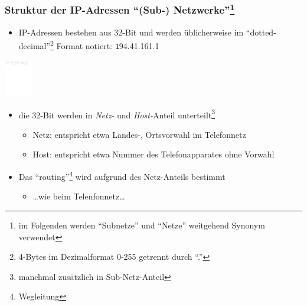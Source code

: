\documentclass{beamer}
\begin{document}
\begin{frame}
\frametitle{Struktur der IP-Adressen ``(Sub-) Netzwerke''\footnote{im Folgenden werden ``Subnetze'' und ``Netze'' weitgehend Synonym verwendet}}
\begin{itemize}
	\item{IP-Adressen bestehen aus 32-Bit und werden \"ublicherweise im ``dotted-decimal''\footnote{4-Bytes im Dezimalformat 0-255 getrennt durch ``.''} Format notiert: {\texttt 194.41.161.1}}
\end{itemize}
  {\center \includegraphics[height=1.6cm]{ip-address}}
\begin{itemize}
	\item{die 32-Bit werden in {\em Netz-} und {\em Host-}Anteil unterteilt\footnote{manchmal zus\"atzlich in Sub-Netz-Anteil}}
	\begin{itemize}
	\item{{\tiny Netz: entspricht etwa Landes-, Ortsvorwahl im Telefonnetz}}
	\item{{\tiny Host: entspricht etwa Nummer des Telefonapparates ohne Vorwahl}}
  \end{itemize}
  \item{Das ``routing''\footnote{Wegleitung} wird aufgrund des Netz-Anteils bestimmt}
  \begin{itemize}
	\item{{\tiny \ldots wie beim Telenfonnetz\ldots}}
\end{itemize}
	\end{itemize}
\end{frame}
\end{document}
